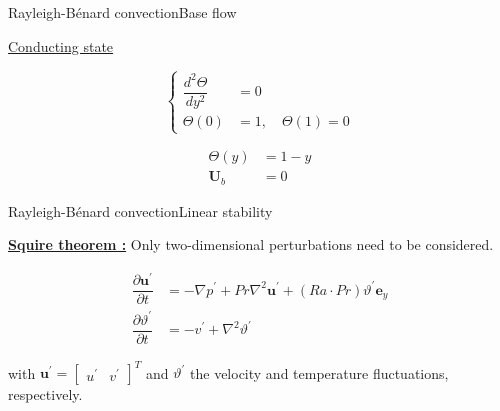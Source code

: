 \documentclass[usenames, dvipsnames, aspectratio=169]{beamer}
\newcommand{\lap}{\nabla^2}
\begin{document}
\begin{frame}[t, c]{Rayleigh-Bénard convection}{Base flow}
  \vfill
  \large

  \centering
  \underline{Conducting state}
  \begin{overprint}
    \[
    \left\{
    \begin{aligned}
      \dfrac{d^2 \Theta}{dy^2} & = 0 \\
      \Theta(0) & = 1, \quad \Theta(1) = 0
    \end{aligned}
    \right.
    \]
    
    \[
    \begin{aligned}
      \Theta(y) & = 1 - y \\
      \bm{U}_b & = 0
    \end{aligned}
    \]
  \end{overprint}
  \vfill
\end{frame}

\begin{frame}[t, c]{Rayleigh-Bénard convection}{Linear stability}
  \vfill
  \large

  \underline{\textbf{Squire theorem :}} Only two-dimensional perturbations need to be considered.

  \bigskip

  \[
  \begin{aligned}
    \dfrac{\partial \bm{u}^{\prime}}{\partial t} & = -\nabla p^{\prime} + Pr \lap \bm{u}^{\prime} + \left(Ra \cdot Pr \right) \vartheta^{\prime} \bm{e}_y \\
    \dfrac{\partial \vartheta^{\prime}}{\partial t} & = - v^{\prime} + \lap \vartheta^{\prime}
  \end{aligned}
  \]

  \bigskip

  with $\bm{u}^{\prime} = \begin{bmatrix} u^{\prime} & v^{\prime} \end{bmatrix}^T$ and $\vartheta^{\prime}$ the velocity and temperature fluctuations, respectively.
  \vfill
\end{frame}
\end{document}
